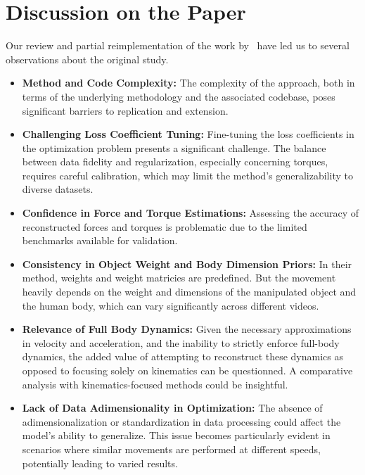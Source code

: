 \section{Discussion on the Paper}
\label{sec:discussion}

Our review and partial reimplementation of the work by~\citet{li2019estimating} have led us to several observations about 
the original study.

\begin{itemize}
    \item \textbf{Method and Code Complexity:} The complexity of the approach, both in terms of the underlying methodology and the associated 
    codebase, poses significant barriers to replication and extension.

    \item \textbf{Challenging Loss Coefficient Tuning:} Fine-tuning the loss coefficients in the optimization problem presents a significant 
    challenge. The balance between data fidelity and regularization, especially concerning torques, requires careful calibration, which may 
    limit the method's generalizability to diverse datasets. 

    \item \textbf{Confidence in Force and Torque Estimations:} Assessing the accuracy of reconstructed forces and torques is problematic due 
    to the limited benchmarks available for validation.

    \item \textbf{Consistency in Object Weight and Body Dimension Priors:} In their method, weights and weight matricies are predefined. 
    But the movement heavily depends on the weight and dimensions of the manipulated object and the human body, which can vary significantly 
    across different videos. 

    \item \textbf{Relevance of Full Body Dynamics:} Given the necessary approximations in velocity and acceleration, and the inability to 
    strictly enforce full-body dynamics, the added value of attempting to reconstruct these dynamics as opposed to focusing 
    solely on kinematics can be questionned. A comparative analysis with kinematics-focused methods could be insightful.

    \item \textbf{Lack of Data Adimensionality in Optimization:} The absence of adimensionalization or standardization in data processing could 
    affect the model's ability to generalize. This issue becomes particularly evident in scenarios where similar movements are performed at 
    different speeds, potentially leading to varied results.

\end{itemize}